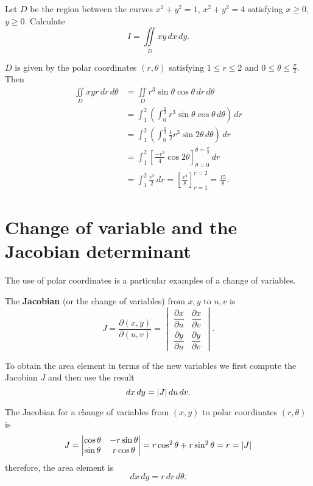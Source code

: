 \begin{example}
    Let $D$ be the region between the curves $x^2 + y^2 = 1$, $x^2 + y^2 = 4$ satisfying $x \geq 0$, $y \geq 0$. Calculate \[ I = \iint\limits_{D} x y \, dx \, dy. \]
    
    $D$ is given by the polar coordinates $(r, \theta)$ satisfying $1 \leq r \leq 2$ and $0 \leq \theta \leq \frac{\pi}{2}$. Then
    \begin{align*}
        \iint\limits_{D} x y r \, dr \, d\theta &= \iint\limits_{D} r^3 \sin{\theta} \cos{\theta} \, dr \, d\theta \\
        &= \int_{1}^{2} \left( \int_{0}^{\frac{\pi}{2}} r^3 \sin{\theta} \cos{\theta} \, d\theta \right) \, dr \\
        &= \int_{1}^{2} \left( \int^{\frac{\pi}{2}}_0 \frac{1}{2} r^3 \sin{2 \theta} \, d\theta \right) \, dr \\
        &= \int_{1}^{2} \left[ \frac{-r^3}{4} \cos{2 \theta} \right]^{\theta = \frac{\pi}{2}}_{\theta = 0} \, dr \\
        &= \int_{1}^{2} \frac{r^3}{2} \, dr = \left[ \frac{r^4}{8} \right]^{r = 2}_{r = 1} = \frac{15}{8}.
    \end{align*}
\end{example}

\section{Change of variable and the Jacobian determinant}

The use of polar coordinates is a particular examples of a change of variables.

\begin{definition}
    The \textbf{Jacobian} (or the change of variables) from $x, y$ to $u, v$ is
    \[
        J = \frac{\partial (x, y)}{\partial (u, v)} =
        \begin{vmatrix}
            \dfrac{\partial x}{\partial u} & \dfrac{\partial x}{\partial v} \\[3ex]
            \dfrac{\partial y}{\partial u} & \dfrac{\partial y}{\partial v}
        \end{vmatrix}
        .
    \]
\end{definition}

To obtain the area element in terms of the new variables we first compute the Jacobian $J$ and then use the result \[ dx \, dy = \lvert J\rvert \, du \, dv. \]

\begin{example}
    The Jacobian for a change of variables from $(x, y)$ to polar coordinates $(r, \theta)$ is
    \[
        J =
        \begin{vmatrix}
            \cos{\theta} & -r \sin{\theta} \\
            \sin{\theta} & r \cos{\theta} \\
        \end{vmatrix}
        = r \cos^2{\theta} + r \sin^2{\theta} = r = \lvert J\rvert
    \]
    therefore, the area element is \[dx \, dy = r \, dr \, d\theta.\]
\end{example}

